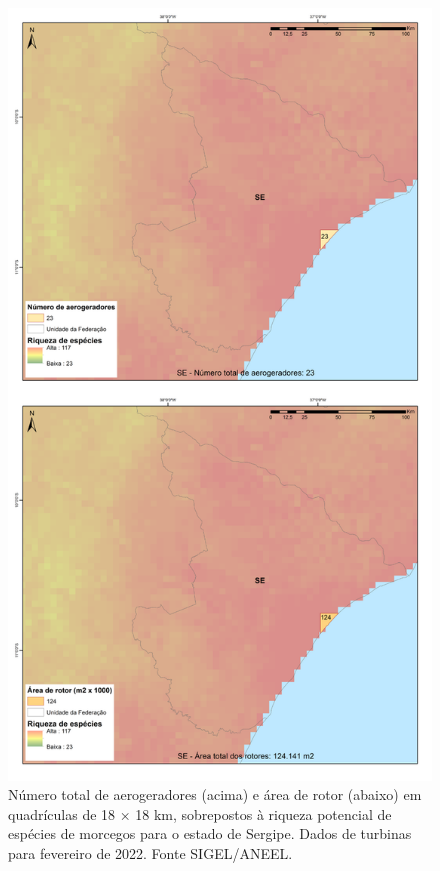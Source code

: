 \documentclass[
  oneside]{scrbook}
\begin{document}
\begin{figure}[H]

{\centering \includegraphics[width=0.75\linewidth]{imagens/cap09/Figura_9.11} 

}

\caption{Número total de aerogeradores (acima) e área de rotor (abaixo) em quadrículas de 18 × 18 km, sobrepostos à riqueza potencial de espécies de morcegos para o estado de Sergipe. Dados de turbinas para fevereiro de 2022. Fonte SIGEL/ANEEL.}\label{fig:76}
\end{figure}
\end{document}

